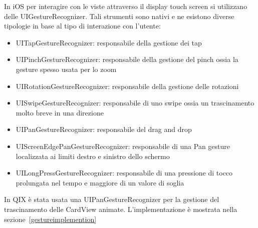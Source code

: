 In iOS per interagire con le viste attraverso il display touch screen si utilizzano delle UIGestureRecognizer.
Tali strumenti sono nativi e ne esistono diverse tipologie in base al tipo di interazione con l'utente:

\begin{itemize}
    \item UITapGestureRecognizer: responsabile della gestione dei tap

    \item UIPinchGestureRecognizer: responsabile della gestione del pinch ossia la gesture spesso usata per lo zoom
    
    \item UIRotationGestureRecognizer: responsabile della gestione delle rotazioni
    
    \item UISwipeGestureRecognizer: responsabile di uno swipe ossia un trascinamento molto breve in una direzione 
    
    \item UIPanGestureRecognizer: responsabile del drag and drop
    
    \item UIScreenEdgePanGestureRecognizer: responsabile di una Pan gesture localizzata ai limiti destro e sinistro dello schermo
    
    \item UILongPressGestureRecognizer: responsabile di una pressione di tocco prolungata nel tempo e maggiore di un valore di soglia
\end{itemize}

In QIX è stata usata una UIPanGestureRecognizer per la gestione del trascinamento delle CardView animate.
L'implementazione è mostrata nella sezione~\ref{gestureimplemention}